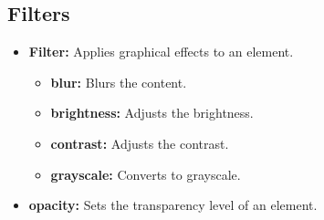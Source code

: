 \documentclass{report}
\begin{document}
    \subsection{Filters}
    \begin{itemize}
        \item \textbf{Filter:} Applies graphical effects to an element.
            \begin{itemize}
                \item \textbf{blur:} Blurs the content.
                \item \textbf{brightness:} Adjusts the brightness.
                \item \textbf{contrast:} Adjusts the contrast.
                \item \textbf{grayscale:} Converts to grayscale.
            \end{itemize}
        \item \textbf{opacity:} Sets the transparency level of an element.
    \end{itemize}

    \pagebreak \bigbreak \noindent 
\end{document}
